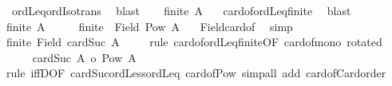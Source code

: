 \begin{isabellebody}
\ \ ordLeq{\isacharunderscore}{\kern0pt}ordIso{\isacharunderscore}{\kern0pt}trans\ \isamarkupfalse%
\ blast\isanewline
\ \ \isamarkupfalse%
\ {\isachardoublequoteopen}finite\ A{\isachardoublequoteclose}\ \isamarkupfalse%
\ {\isacharasterisk}{\kern0pt}\ card{\isacharunderscore}{\kern0pt}of{\isacharunderscore}{\kern0pt}ordLeq{\isacharunderscore}{\kern0pt}finite\ \isamarkupfalse%
\ blast\isanewline
{}\isamarkupfalse%
\isanewline
\ \ \isamarkupfalse%
\ {\isachardoublequoteopen}finite\ A{\isachardoublequoteclose}\isanewline
\ \ \isamarkupfalse%
\ \isamarkupfalse%
\ {\isachardoublequoteopen}finite\ {\isacharparenleft}{\kern0pt}\ Field\ {\isacharbar}{\kern0pt}Pow\ A{\isacharbar}{\kern0pt}\ {\isacharparenright}{\kern0pt}{\isachardoublequoteclose}\ \isamarkupfalse%
\ Field{\isacharunderscore}{\kern0pt}card{\isacharunderscore}{\kern0pt}of\ \isamarkupfalse%
\ simp\isanewline
\ \ \isamarkupfalse%
\ \isamarkupfalse%
\ {\isachardoublequoteopen}finite\ {\isacharparenleft}{\kern0pt}Field\ {\isacharparenleft}{\kern0pt}cardSuc\ {\isacharbar}{\kern0pt}A{\isacharbar}{\kern0pt}\ {\isacharparenright}{\kern0pt}{\isacharparenright}{\kern0pt}{\isachardoublequoteclose}\isanewline
\ \ \isamarkupfalse%
\ {\isacharparenleft}{\kern0pt}rule\ card{\isacharunderscore}{\kern0pt}of{\isacharunderscore}{\kern0pt}ordLeq{\isacharunderscore}{\kern0pt}finite{\isacharbrackleft}{\kern0pt}OF\ card{\isacharunderscore}{\kern0pt}of{\isacharunderscore}{\kern0pt}mono{}{\isacharcomma}{\kern0pt}\ rotated{\isacharbrackright}{\kern0pt}{\isacharparenright}{\kern0pt}\isanewline
\ \ \ \ \isamarkupfalse%
\ {\isachardoublequoteopen}cardSuc\ {\isacharbar}{\kern0pt}A{\isacharbar}{\kern0pt}\ {\isasymle}o\ {\isacharbar}{\kern0pt}Pow\ A{\isacharbar}{\kern0pt}{\isachardoublequoteclose}\isanewline
\ \ \ \ \ \ \isamarkupfalse%
\ {\isacharparenleft}{\kern0pt}rule\ iffD{}{\isacharbrackleft}{\kern0pt}OF\ cardSuc{\isacharunderscore}{\kern0pt}ordLess{\isacharunderscore}{\kern0pt}ordLeq\ card{\isacharunderscore}{\kern0pt}of{\isacharunderscore}{\kern0pt}Pow{\isacharbrackright}{\kern0pt}{\isacharparenright}{\kern0pt}\ {\isacharparenleft}{\kern0pt}simp{\isacharunderscore}{\kern0pt}all\ add{\isacharcolon}{\kern0pt}\ card{\isacharunderscore}{\kern0pt}of{\isacharunderscore}{\kern0pt}Card{\isacharunderscore}{\kern0pt}order{\isacharparenright}{\kern0pt}\isanewline

\end{isabellebody}
